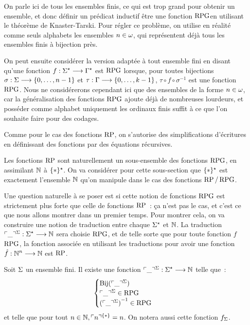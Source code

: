 \begin{remark}
  On parle ici de tous les ensembles finis, ce qui est trop grand pour obtenir
  un ensemble, et donc définir un prédicat inductif \og être une fonction
  $\operatorname{RPG}$\fg en utilisant le théorème de Knaster-Tarski. Pour régler ce problème,
  on utilise en réalité comme seuls alphabets les ensembles $n \in \omega$, qui
  représentent déjà tous les ensembles finis à bijection près.

  On peut ensuite considérer la version adaptée à tout ensemble fini en disant
  qu'une fonction $f : \displaystyle \Sigma^{\star} \longrightarrow \Gamma^{\star}$ est $\operatorname{RPG}$ lorsque, pour
  toutes bijections $\sigma : \displaystyle \Sigma \longrightarrow \{0,\ldots,n - 1\}$ et
  $\tau : \displaystyle \Gamma \longrightarrow \{0,\ldots,k - 1\}$, $\tau\circ f \circ \sigma^{-1}$ est
  une fonction $\operatorname{RPG}$. Nous ne considérerons cependant ici que des ensembles de
  la forme $n \in \omega$, car la généralisation des fonctions $\operatorname{RPG}$ ajoute déjà
  de nombreuses lourdeurs, et posséder comme alphabet uniquement les ordinaux
  finis suffit à ce que l'on souhaite faire pour des codages.
\end{remark}

\begin{notation}
  Comme pour le cas des fonctions $\operatorname{RP}$, on s'autorise des simplifications
  d'écritures en définissant des fonctions par des équations récursives.
\end{notation}

Les fonctions $\operatorname{RP}$ sont naturellement un sous-ensemble des fonctions $\operatorname{RPG}$,
en assimilant $\mathbb N$ à $\{*\}^{\star}$. On va considérer pour cette sous-section
que $\{*\}^{\star}$ est exactement l'ensemble $\mathbb N$ qu'on manipule dans le cas
des fonctions $\operatorname{RP}/\operatorname{RPG}$.

Une question naturelle à se poser est si cette notion de fonctions $\operatorname{RPG}$ est
strictement plus forte que celle de fonctions $\operatorname{RP}$~: ça n'est pas le cas, et
c'est ce que nous allons montrer dans un premier temps. Pour montrer cela, on va
construire une notion de traduction entre chaque $\Sigma^{\star}$ et $\mathbb N$. La
traduction $\ulcorner\mathord{\_}\urcorner^{\Sigma} : \displaystyle \Sigma^{\star} \longrightarrow \mathbb N$ sera choisie $\operatorname{RPG}$,
et de telle sorte que pour toute fonction $f$ $\operatorname{RPG}$, la fonction associée en
utilisant les traductions pour avoir une fonction
$\hat{f} : \displaystyle \mathbb N^n \longrightarrow \mathbb N$ est $\operatorname{RP}$.

\begin{definition}
  \label{def.trad.RPG}
  Soit $\Sigma$ un ensemble fini. Il existe une fonction
  $\ulcorner\mathord{\_}\urcorner^{\Sigma} : \displaystyle \Sigma^{\star} \longrightarrow \mathbb N$ telle que~:
  \[\begin{cases}
  \operatorname{Bij}(\ulcorner\mathord{\_}\urcorner^{\Sigma})\\
  \ulcorner\mathord{\_}\urcorner^{\Sigma}\in \operatorname{RPG}\\
         {(\ulcorner\mathord{\_}\urcorner^{\Sigma})}^{-1}\in\operatorname{RPG}
  \end{cases}\]
  et telle que pour tout $n \in \mathbb N, \ulcorner n\urcorner^{\{*\}} = n$. On notera aussi
  cette fonction $f_\Sigma$.
  \index[notation]{$\codRPG{\varwd}{\ABA}$}
\end{definition}

